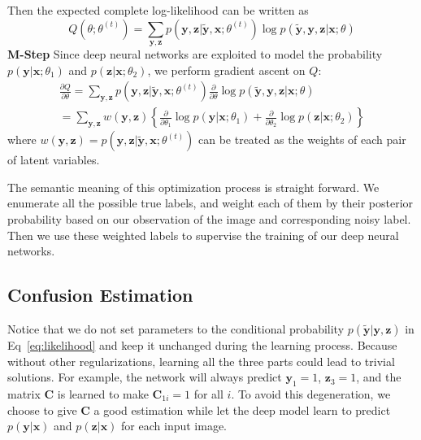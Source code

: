 \documentclass[10pt,twocolumn,letterpaper]{article}
\def\vec{\mathbf}
\def\mat{\mathbf}
\begin{document}
Then the expected complete log-likelihood can be written as
\begin{equation}
    Q(\theta; \theta^{(t)}) = \sum_{\vec{y},\vec{z}} p(\vec{y}, \vec{z} | \tilde{\vec{y}}, \vec{x}; \theta^{(t)}) \log p(\tilde{\vec{y}}, \vec{y}, \vec{z} | \vec{x}; \theta)
\end{equation}
\textbf{M-Step} Since deep neural networks are exploited to model the probability $p(\vec{y}|\vec{x};\theta_1)$ and $p(\vec{z}|\vec{x};\theta_2)$, we perform gradient ascent on $Q$:
\begin{multline}
    \frac{\partial Q}{\partial \theta} = \sum_{\vec{y},\vec{z}} p(\vec{y}, \vec{z} | \tilde{\vec{y}}, \vec{x}; \theta^{(t)}) \frac{\partial}{\partial \theta} \log p(\tilde{\vec{y}}, \vec{y}, \vec{z} | \vec{x}; \theta) \\
    = \sum_{\vec{y},\vec{z}} w(\vec{y},\vec{z}) \left\{\frac{\partial}{\partial \theta_1}\log p(\vec{y}|\vec{x};\theta_1) + \frac{\partial}{\partial \theta_2} \log p(\vec{z}|\vec{x};\theta_2) \right\}
\end{multline}
where $w(\vec{y},\vec{z}) = p(\vec{y}, \vec{z} | \tilde{\vec{y}}, \vec{x}; \theta^{(t)})$ can be treated as the weights of each pair of latent variables.

The semantic meaning of this optimization process is straight forward. We enumerate all the possible true labels, and weight each of them by their posterior probability based on our observation of the image and corresponding noisy label. Then we use these weighted labels to supervise the training of our deep neural networks.

\subsection{Confusion Estimation} %
\label{sub:confusion_estimation}
Notice that we do not set parameters to the conditional probability $p(\tilde{\vec{y}}|\vec{y},\vec{z})$ in Eq~\eqref{eq:likelihood} and keep it unchanged during the learning process. Because without other regularizations, learning all the three parts could lead to trivial solutions. For example, the network will always predict $\vec{y}_1 = 1$, $\vec{z}_3 = 1$, and the matrix $\mat{C}$ is learned to make $\mat{C}_{1i} = 1$ for all $i$. To avoid this degeneration, we choose to give $\mat{C}$ a good estimation while let the deep model learn to predict $p(\vec{y} | \vec{x})$ and $p(\vec{z} | \vec{x})$ for each input image.
\end{document}
